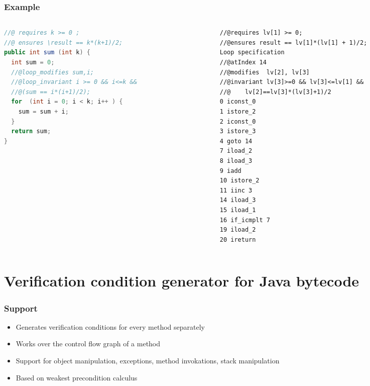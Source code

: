 \documentclass{beamer}
\begin{document}
\begin{frame}\frametitle{Example}
\begin{columns}
\begin{column}{5.1cm}
{\tiny
\begin{lstlisting}[language=java]
//@ requires k >= 0 ;
//@ ensures \result == k*(k+1)/2;
public int sum (int k) {
  int sum = 0;		
  //@loop_modifies sum,i;
  //@loop_invariant i >= 0 && i<=k && 
  //@(sum == i*(i+1)/2);
  for  (int i = 0; i < k; i++ ) {
    sum = sum + i;
  } 	
  return sum;
}
\end{lstlisting}}
\end{column}

\begin{column}{5.1cm}
{\tiny
\begin{lstlisting}[language=jvmis]
//@requires lv[1] >= 0;
//@ensures result == lv[1]*(lv[1] + 1)/2;
Loop specification
//@atIndex 14 
//@modifies  lv[2], lv[3]
//@invariant lv[3]>=0 && lv[3]<=lv[1] &&
//@    lv[2]==lv[3]*(lv[3]+1)/2
0 iconst_0
1 istore_2
2 iconst_0
3 istore_3
4 goto 14 
7 iload_2
8 iload_3
9 iadd
10 istore_2 
11 iinc 3 
14 iload_3
15 iload_1
16 if_icmplt 7 
19 iload_2
20 ireturn
\end{lstlisting}}
\end{column}
\end{columns}
\end{frame}

\section{Verification condition generator for Java bytecode}
\begin{frame}\frametitle{Support} 
  \begin{itemize}
   \item Generates verification conditions for every method separately
   \item Works over the control flow graph of a method
   \item Support for object manipulation, exceptions, method invokations, stack manipulation
   \item Based on weakest precondition calculus
\end{itemize}

\end{frame}
\end{document}
